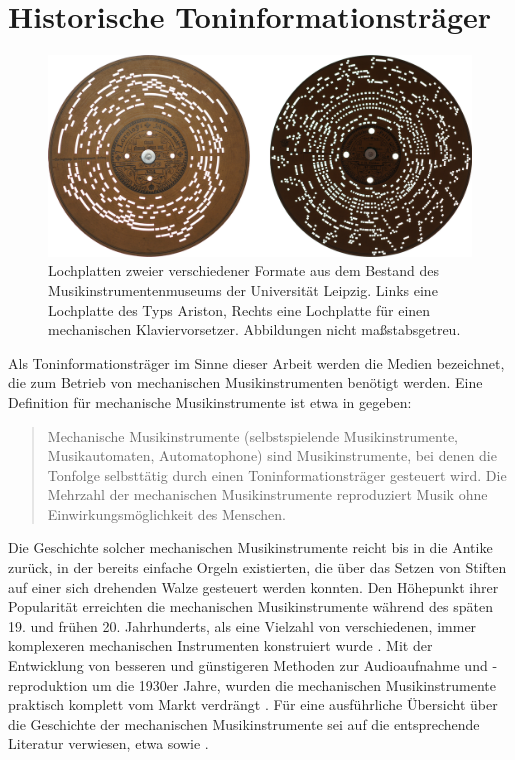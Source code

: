 \FloatBarrier
\section{Historische Toninformationsträger}

\begin{figure}[t]
    \centering
    \includegraphics[width=\textwidth]{graphics/cardboard_plates.png}
    \caption{Lochplatten zweier verschiedener Formate aus dem Bestand des Musikinstrumentenmuseums der Universität Leipzig. Links eine Lochplatte des Typs Ariston, Rechts eine Lochplatte für einen mechanischen Klaviervorsetzer. Abbildungen nicht maßstabsgetreu.}
    \label{platten}
\end{figure}

Als Toninformationsträger im Sinne dieser Arbeit werden die Medien bezeichnet, die zum Betrieb von mechanischen Musikinstrumenten benötigt werden.
Eine Definition für mechanische Musikinstrumente ist etwa in \textcite[]{mgg_mechanische} gegeben:

\begin{quotation}
    Mechanische Musikinstrumente (selbstspielende Musikinstrumente, Musikautomaten, Automatophone) sind Musikinstrumente, bei denen die Tonfolge selbsttätig durch einen Toninformationsträger gesteuert wird. Die Mehrzahl der mechanischen Musikinstrumente reproduziert Musik ohne Einwirkungsmöglichkeit des Menschen. \parencite[I. Definition]{mgg_mechanische}
\end{quotation}

Die Geschichte solcher mechanischen Musikinstrumente reicht bis in die Antike zurück, in der bereits einfache Orgeln existierten, die über das Setzen von Stiften auf einer sich drehenden Walze gesteuert werden konnten.
Den Höhepunkt ihrer Popularität erreichten die mechanischen Musikinstrumente während des späten 19. und frühen 20. Jahrhunderts, als eine Vielzahl von verschiedenen, immer komplexeren mechanischen Instrumenten konstruiert wurde \parencite[10-12]{bowers_1972}.
Mit der Entwicklung von besseren und günstigeren Methoden zur Audioaufnahme und -reproduktion um die 1930er Jahre, wurden die mechanischen Musikinstrumente praktisch komplett vom Markt verdrängt \parencite[2]{zoltan_1994}.
Für eine ausführliche Übersicht über die Geschichte der mechanischen Musikinstrumente sei auf die entsprechende Literatur verwiesen, etwa \textcite[]{bowers_1972,bowers_1975} sowie \textcite[]{mgg_mechanische}.

